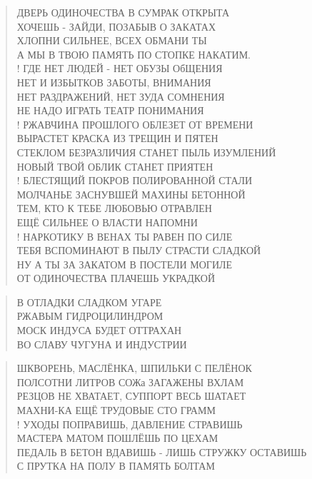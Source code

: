 \poemtitle{***}
\begin{verse}
ДВЕРЬ ОДИНОЧЕСТВА В СУМРАК ОТКРЫТА\\
ХОЧЕШЬ - ЗАЙДИ, ПОЗАБЫВ О ЗАКАТАХ\\
ХЛОПНИ СИЛЬНЕЕ, ВСЕХ ОБМАНИ ТЫ\\
А МЫ В ТВОЮ ПАМЯТЬ ПО СТОПКЕ НАКАТИМ.\\!
ГДЕ НЕТ ЛЮДЕЙ - НЕТ ОБУЗЫ ОбЩЕНИЯ\\
НЕТ И ИЗБЫТКОВ ЗАБОТЫ, ВНИМАНИЯ\\
НЕТ РАЗДРАЖЕНИЙ, НЕТ ЗУДА СОМНЕНИЯ\\
НЕ НАДО ИГРАТЬ ТЕАТР ПОНИМАНИЯ\\!
РЖАВЧИНА ПРОШЛОГО ОБЛЕЗЕТ ОТ ВРЕМЕНИ\\
ВЫРАСТЕТ КРАСКА ИЗ ТРЕЩИН И ПЯТЕН\\
СТЕКЛОМ БЕЗРАЗЛИЧИЯ СТАНЕТ ПЫЛЬ ИЗУМЛЕНИЙ\\
НОВЫЙ ТВОЙ ОБЛИК СТАНЕТ ПРИЯТЕН\\!
БЛЕСТЯЩИЙ ПОКРОВ ПОЛИРОВАННОЙ СТАЛИ\\
МОЛЧАНЬЕ ЗАСНУВШЕЙ МАХИНЫ БЕТОННОЙ\\
ТЕМ, КТО К ТЕБЕ ЛЮБОВЬЮ ОТРАВЛЕН\\
ЕЩЁ СИЛЬНЕЕ О ВЛАСТИ НАПОМНИ\\!
НАРКОТИКУ В ВЕНАХ ТЫ РАВЕН ПО СИЛЕ\\
ТЕБЯ ВСПОМИНАЮТ В ПЫЛУ СТРАСТИ СЛАДКОЙ\\
НУ А ТЫ ЗА ЗАКАТОМ В ПОСТЕЛИ МОГИЛЕ\\
ОТ ОДИНОЧЕСТВА ПЛАЧЕШЬ УКРАДКОЙ
\end{verse}

\poemtitle{***}
\begin{verse}
В ОТЛАДКИ СЛАДКОМ УГАРЕ\\
РЖАВЫМ ГИДРОЦИЛИНДРОМ\\
МОСК ИНДУСА БУДЕТ ОТТРАХАН\\
ВО СЛАВУ ЧУГУНА И ИНДУСТРИИ
\end{verse}

\poemtitle{***}
\begin{verse}
ШКВОРЕНЬ, МАСЛЁНКА, ШПИЛЬКИ С ПЕЛЁНОК\\
ПОЛСОТНИ ЛИТРОВ СОЖа ЗАГАЖЕНЫ ВХЛАМ\\
РЕЗЦОВ НЕ ХВАТАЕТ, СУППОРТ ВЕСЬ ШАТАЕТ\\
МАХНИ-КА ЕЩЁ ТРУДОВЫЕ СТО ГРАММ\\!
УХОДЫ ПОПРАВИШЬ, ДАВЛЕНИЕ СТРАВИШЬ\\
МАСТЕРА МАТОМ ПОШЛЁШЬ ПО ЦЕХАМ\\
ПЕДАЛЬ В БЕТОН ВДАВИШЬ - ЛИШЬ СТРУЖКУ ОСТАВИШЬ\\
С ПРУТКА НА ПОЛУ В ПАМЯТЬ БОЛТАМ
\end{verse}


